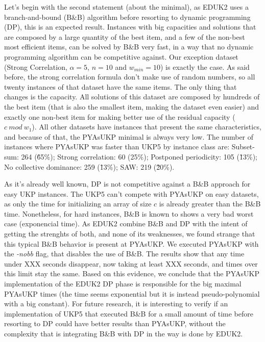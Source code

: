 \documentclass[runningheads,a4paper]{llncs}
\begin{document}
Let's begin with the second statement (about the minimal), as EDUK2 uses a branch-and-bound (B\&B) algorithm before resorting to dynamic programming (DP), this is an expected result. Instances with big capacities and solutions that are composed by a large quantity of the best item, and a few of the non-best most efficient items, can be solved by B\&B very fast, in a way that no dynamic programming algorithm can be competitive against. Our exception dataset (Strong Correlation, \(\alpha = 5\), \(n = 10\) and \(w_{min} = 10\)) is exactly the case. As said before, the strong correlation formula don't make use of random numbers, so all twenty instances of that dataset have the same items. The only thing that changes is the capacity. All solutions of this dataset are composed by hundreds of the best item (that is also the smallest item, making the dataset even easier) and exactly one non-best item for making better use of the residual capacity (\(c~mod~w_1\)). All other datasets have instances that present the same characteristics, and because of that, the PYAsUKP minimal is always very low. The number of instances where PYAsUKP was faster than UKP5 by instance class are: Subset-sum: 264 (\~65\%); Strong correlation: 60 (25\%); Postponed periodicity: 105 (\~13\%); No collective dominance: 259 (\~13\%); SAW: 219 (\~20\%).


As it's already well known, DP is not competitive against a B\&B approach for easy UKP instances. The UKP5 can't compete with PYAsUKP on easy datasets, as only the time for initializing an array of size \(c\) is already greater than the B\&B time. Nonetheless, for hard instances, B\&B is known to shows a very bad worst case (exponencial time). As EDUK2 combine B\&B and DP with the intent of getting the strenghts of both, and none of its weaknesses, we found strange that this typical B\&B behavior is present at PYAsUKP. We executed PYAsUKP with the \emph{-nobb} flag, that disables the use of B\&B. The results show that any time under XXX seconds disappear, now taking at least XXX seconds, and times over this limit stay the same. Based on this evidence, we conclude that the PYAsUKP implementation of the EDUK2 DP phase is responsible for the big maximal PYAsUKP times (the time seems exponential but it is instead pseudo-polynomial with a big constant). For future research, it is interesting to verify if an implementation of UKP5 that executed B\&B for a small amount of time before resorting to DP could have better results than PYAsUKP, without the complexity that is integrating B\&B with DP in the way is done by EDUK2.
\end{document}
